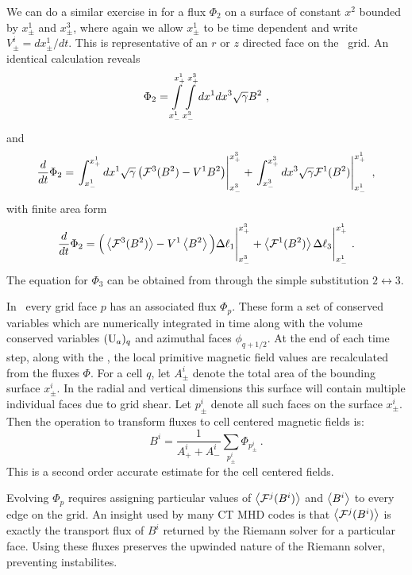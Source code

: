 We can do a similar exercise in for a flux $\Phi_2$ on a surface of constant $x^2$ bounded by $x^1_\pm$ and $x^3_\pm$, where again we allow $x^1_\pm$ to be time dependent and write $V^i_\pm = d x^1_\pm / dt$.  This is representative of an $r$ or $z$ directed face on the \disco\ grid. An identical calculation reveals
\begin{equation}
	\Phi_2 = \int \limits_{x^1_-}^{x^1_+} \int \limits_{x^3_-}^{x^3_+} dx^1 dx^3 \sqrt{\gamma} B^2\ ,
\end{equation}
and 
\begin{equation}
	\frac{d}{dt}\Phi_2 = \left . \int_{x^1_-}^{x^1_+}  dx^1 \sqrt{\gamma} \left( \mathcal{F}^3(B^2) - V^1 B^2\right) \right |^{x^3_+}_{x^3_-} + \left . \int_{x^3_-}^{x^3_+}  dx^3 \sqrt{\gamma} \mathcal{F}^1(B^2) \right |^{x^1_+}_{x^1_-}\ ,
\end{equation}
with finite area form
\begin{equation}
	\frac{d}{dt}\Phi_2 =  \Big(\ave{\FF^3(B^2)} - V^1 \ave{B^2} \Big) \Delta \ell_1 \Bigg |^{x^3_+}_{x^3_-} +  \ave{\FF^1(B^2)}\Delta \ell_3 \Bigg |^{x^1_+}_{x^1_-}\ . \eqlabel{dphi2dtFA}
\end{equation}
The equation for $\Phi_3$ can be obtained from  through the simple substitution $2\leftrightarrow3$.

In \grdisco\ every grid face $p$ has an associated flux $\Phi_p$.  These form a set of conserved variables which are numerically integrated in time along with the volume conserved variables $(\mathrm{U}_a)_q$ and azimuthal faces $\phi_{q+1/2}$. At the end of each time step, along with the \ctop, the local primitive magnetic field values are recalculated from the fluxes $\Phi$.  For a cell $q$, let $A^i_\pm$ denote the total area of the bounding surface $x^i_\pm$.  In the radial and vertical dimensions this surface will contain multiple individual faces due to grid shear.  Let $p^i_\pm$ denote all such faces on the surface $x^i_\pm$.  Then the operation to transform fluxes to cell centered magnetic fields is:
\begin{equation}
	B^i = \frac{1}{A^i_+ + A^i_-} \sum_{p^i_\pm} \Phi_{p^i_\pm}\ .
\end{equation}
This is a second order accurate estimate for the cell centered fields.

Evolving $\Phi_p$ requires assigning particular values of $\left \langle \mathcal{F}^j(B^i) \right \rangle$ and $\left \langle B^i \right \rangle$ to every edge on the grid. An insight used by many CT MHD codes is that $\left \langle \mathcal{F}^j(B^i) \right \rangle$ is exactly the transport flux of $B^i$ returned by the Riemann solver for a particular face.  Using these fluxes preserves the upwinded nature of the Riemann solver, preventing instabilites.

